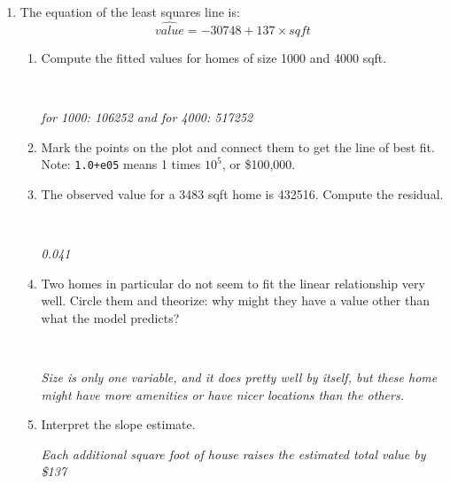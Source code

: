 \begin{enumerate}
  \item The equation of the least squares line is:
  $$  \widehat{value} =  -30748 + 137\times{sqft}$$
  \begin{enumerate}
  \item Compute the fitted values for homes of size 1000 and 4000 sqft.
\begin{students}
 \vspace{2cm}\\
\end{students}

\begin{key}
  {\it  for 1000: 106252  and for 4000: 517252 }
\end{key}
   \item  Mark the points on the plot and connect them to get the line
     of best fit.  \\
      Note: \verb|1.0+e05| means 1 times $10^5$, or \$100,000.  \vspace{.1in}
   \item The observed value for a 3483 sqft home is  432516.
     Compute the residual.
\begin{students}
 \vspace{2cm}\\
\end{students}

\begin{key}
  {\it  0.041}
\end{key}
   \item  Two homes in particular do not seem to fit the linear
     relationship very well.  Circle them and theorize: why might they
     have a value other than what the model predicts?  
\begin{students}
 \vspace{2cm}\\
\end{students}

\begin{key}
  {\it Size is only one variable, and it does pretty well by itself,
    but these home might have more amenities or have nicer locations
    than the others.}
\end{key}

\item Interpret the slope estimate. 
\begin{students}
 \vspace{2cm}
\end{students}

\begin{key}
  {\it Each additional square foot of house raises the estimated total
  value by \$137 }
\end{key}


\end{enumerate}
\end{enumerate}
